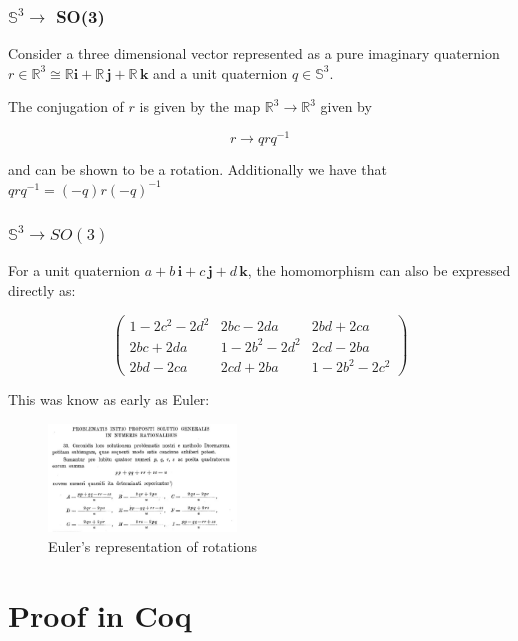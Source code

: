 \documentclass{beamer}
\begin{document}
\begin{frame}
\frametitle{$\mathbb{S} ^ 3 \to$ SO(3) }

\begin{definition}
	Consider a three dimensional vector represented as a pure imaginary quaternion $r \in \mathbb{R} ^ 3 \cong  \mathbb{R} \mathbf{i} +  \mathbb{R}\,\mathbf{j} + \mathbb{R} \,\mathbf{k}$ and a unit quaternion $q \in \mathbb{S} ^ 3$. \vspace{10pt}

The conjugation of $r$ is given by the map $\mathbb{R} ^ 3 \to \mathbb{R} ^ 3$ given by

$$
r \to q r q^{-1}
$$

and can be shown to be a rotation. Additionally we have that $q r q^{-1} = (- q) r (- q)^{-1}$ 
\end{definition}
\end{frame}

\begin{frame}
\frametitle{$\mathbb{S} ^ 3 \to SO(3) $ }

For a unit quaternion $a + b\,\mathbf{i} +  c\,\mathbf{j} + d\,\mathbf{k}$, the homomorphism can also be expressed directly as:

$$
 \begin{pmatrix}
 1 - 2 c^2 - 2 d^2 & 2 b c - 2 d a & 2 b d + 2 c a \\
 2 b c + 2 d a & 1 - 2 b^2 - 2 d^2 & 2 c d - 2 b a \\
 2 b d - 2 c a & 2 c d + 2 b a & 1 - 2 b^2 - 2 c^2
\end{pmatrix}
$$

This was know as early as Euler:

\begin{figure}
		\includegraphics[width=5cm]{Euler}
    \caption{Euler's representation of rotations}
\end{figure}

\end{frame}

\section{Proof in Coq}
\end{document}
